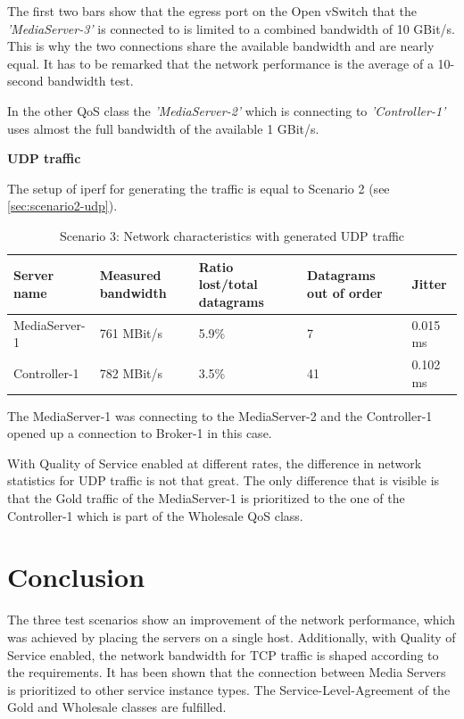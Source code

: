 The first two bars show that the egress port on the Open vSwitch that the \textit{'MediaServer-3'} is connected to is limited to a combined bandwidth of 10 GBit/s. This is why the two connections share the available bandwidth and are nearly equal. It has to be remarked that the network performance is the average of a 10-second bandwidth test.

In the other QoS class the \textit{'MediaServer-2'} which is connecting to \textit{'Controller-1'} uses almost the full bandwidth of the available 1 GBit/s.

\textbf{UDP traffic}

The setup of iperf for generating the traffic is equal to Scenario 2 (see \ref{sec:scenario2-udp}).

\begin{table}[H]
\centering

\begin{tabularx}{\textwidth}{ |X|X|X|X|X| }
\hline Server name & Measured bandwidth & Ratio lost/total datagrams & Datagrams out of order & Jitter \\ 
\hline MediaServer-1 & 761 MBit/s & 5.9\% & 7 & 0.015 ms\\ 
\hline Controller-1 & 782 MBit/s & 3.5\% & 41 & 0.102 ms \\ 
\hline 
\end{tabularx}

\caption{Scenario 3: Network characteristics with generated UDP traffic}
\end{table}

The MediaServer-1 was connecting to the MediaServer-2 and the Controller-1 opened up a connection to Broker-1 in this case.

With Quality of Service enabled at different rates, the difference in network statistics for UDP traffic is not that great. The only difference that is visible is that the Gold traffic of the MediaServer-1 is prioritized to the one of the Controller-1 which is part of the Wholesale QoS class.



\section{Conclusion}

The three test scenarios show an improvement of the network performance, which was achieved by placing the servers on a single host. Additionally, with Quality of Service enabled, the network bandwidth for TCP traffic is shaped according to the requirements. It has been shown that the connection between Media Servers is prioritized to other service instance types. The Service-Level-Agreement of the Gold and Wholesale classes are fulfilled.